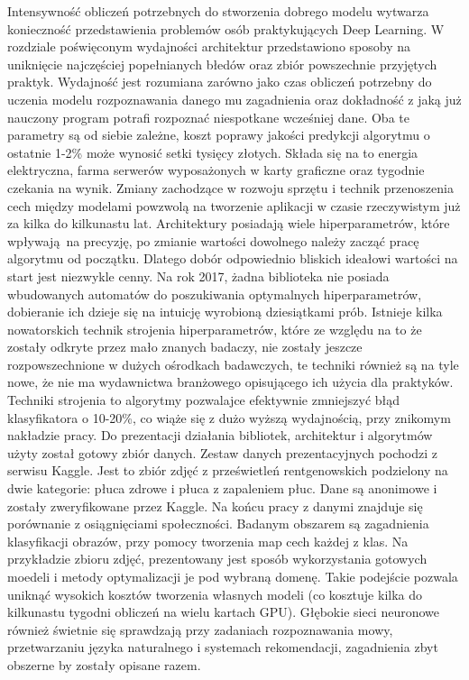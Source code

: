 \documentclass[12pt,a4paper,twoside,titlepage,openright]{book}
\begin{document}
Intensywność obliczeń potrzebnych do stworzenia dobrego modelu wytwarza konieczność przedstawienia problemów osób praktykujących Deep Learning. W rozdziale poświęconym wydajności architektur przedstawiono sposoby na uniknięcie najczęściej popełnianych błedów oraz zbiór powszechnie przyjętych praktyk. Wydajność jest rozumiana zarówno jako czas obliczeń potrzebny do uczenia modelu rozpoznawania danego mu zagadnienia oraz dokładność z jaką już nauczony program potrafi rozpoznać niespotkane wcześniej dane. Oba te parametry są od siebie zależne, koszt poprawy jakości predykcji algorytmu o ostatnie 1-2\% może wynosić setki tysięcy złotych. Składa się na to energia elektryczna, farma serwerów wyposażonych w karty graficzne oraz tygodnie czekania na wynik. Zmiany zachodzące w rozwoju sprzętu i technik przenoszenia cech między modelami powzwolą na tworzenie aplikacji w czasie rzeczywistym już za kilka do kilkunastu lat.
Architektury posiadają wiele hiperparametrów, które wpływają na precyzję, po zmianie wartości dowolnego należy zacząć pracę algorytmu od początku. Dlatego dobór odpowiednio bliskich ideałowi wartości na start jest niezwykle cenny. Na rok 2017, żadna biblioteka nie posiada wbudowanych automatów do poszukiwania optymalnych hiperparametrów, dobieranie ich dzieje się na intuicję wyrobioną dziesiątkami prób. Istnieje kilka nowatorskich technik strojenia hiperparametrów, które ze względu na to że zostały odkryte przez mało znanych badaczy, nie zostały jeszcze rozpowszechnione w dużych ośrodkach badawczych, te techniki również są na tyle nowe, że nie ma wydawnictwa branżowego opisującego ich użycia dla praktyków. Techniki strojenia to algorytmy pozwalajce efektywnie zmniejszyć błąd klasyfikatora o 10-20\%, co wiąże się z dużo wyższą wydajnością, przy znikomym nakładzie pracy. 
Do prezentacji działania bibliotek, architektur i algorytmów użyty został gotowy zbiór danych. Zestaw danych prezentacyjnych pochodzi z serwisu Kaggle. Jest to zbiór zdjęć z prześwietleń rentgenowskich podzielony na dwie kategorie: płuca zdrowe i płuca z zapaleniem płuc. Dane są anonimowe i zostały zweryfikowane przez Kaggle. Na końcu pracy z danymi znajduje się porównanie z osiągnięciami społeczności. Badanym obszarem są zagadnienia klasyfikacji obrazów, przy pomocy tworzenia map cech każdej z klas. Na przykładzie zbioru zdjęć, prezentowany jest sposób wykorzystania gotowych moedeli i metody optymalizacji je pod wybraną domenę. Takie podejście pozwala uniknąć wysokich kosztów tworzenia własnych modeli (co kosztuje kilka do kilkunastu tygodni obliczeń na wielu kartach GPU). 
Głębokie sieci neuronowe również świetnie się sprawdzają przy zadaniach rozpoznawania mowy, przetwarzaniu języka naturalnego i systemach rekomendacji, zagadnienia zbyt obszerne by zostały opisane razem.
\end{document}
